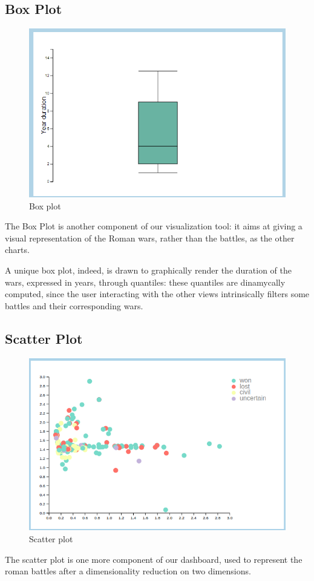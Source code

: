 \subsection{Box Plot}
\begin{figure}[h]
    \centering
    \includegraphics[scale=0.5]{./images/box_plot.png}
    \caption{Box plot}
\end{figure}
The Box Plot is another component of our visualization tool: it aims at giving a visual representation of the Roman wars, rather than the battles, as the other charts.

A unique box plot, indeed, is drawn to graphically render the duration of the wars, expressed in years, through quantiles: these quantiles are dinamycally computed, since the user interacting with the other views intrinsically filters some battles and their corresponding wars.

\subsection{Scatter Plot}
\begin{figure}[h]
    \centering
    \includegraphics[scale=0.30]{./images/scatter_plot.png}
    \caption{Scatter plot}
\end{figure}
The scatter plot is one more component of our dashboard, used to represent the roman battles after a dimensionality reduction on two dimensions.

